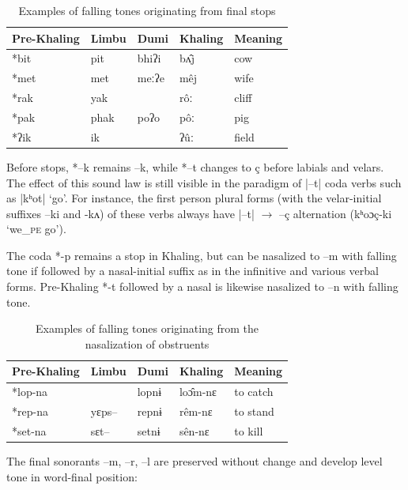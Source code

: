 \documentclass[oldfontcommands,oneside,a4paper,11pt]{article}
\newcommand{\ipa}[1]{{\phon \mbox{#1}}} %
\begin{document}
\begin{table}[h]
\caption{Examples of falling tones originating from final stops} \centering \label{tab:fall.stop}
\begin{tabular}{lllll}
\toprule
Pre-Khaling	&Limbu	&Dumi	&Khaling	&Meaning\\
\midrule
\ipa{*bit}	& \ipa{pit} &	\ipa{bhiʔi}	 & \ipa{bʌ̂j} &	cow\\
\ipa{*met} &	\ipa{met}	& \ipa{meːʔe} &	\ipa{mêj} &	wife\\
\ipa{*rak}	& \ipa{yak}	& &	\ipa{rôː}	& cliff \\
\ipa{*pak} &	\ipa{phak}	& \ipa{poʔo}	& \ipa{pôː}	& pig\\
\ipa{*ʔik}	& \ipa{ik}	& &	\ipa{ʔûː}	& field\\
\bottomrule
\end{tabular}
\end{table}
 
Before stops, \ipa{*--k} remains \ipa{--k}, while \ipa{*--t} changes to \ipa{ç} before labials and velars. The effect of this sound law  is still visible in the paradigm of  |--t| coda verbs such as |\ipa{kʰot}| `go'. For instance, the first person plural forms (with the velar-initial suffixes \ipa{--ki} and \ipa{-kʌ}) of these verbs always have |--t| $\rightarrow$ \ipa{--ç} alternation  (\ipa{kʰoɔç-ki} `we_{\textsc{pe}} go').

The coda \ipa{*-p} remains a stop in Khaling, but can be nasalized to \ipa{–m} with falling tone if followed by a nasal-initial suffix as in the infinitive and various verbal forms. Pre-Khaling \ipa{*-t} followed by a nasal is likewise nasalized to \ipa{--n} with falling tone.
\begin{table}[h]
\caption{Examples of falling tones originating from the nasalization of obstruents} \centering
\begin{tabular}{lllll}
\toprule
Pre-Khaling	&Limbu	&Dumi	&Khaling	&Meaning\\
\midrule
\ipa{*lop-na}	& & \ipa{lopnɨ}	 & \ipa{loɔ̂m-nɛ}	&to catch\\
\ipa{*rep-na}	&\ipa{yɛps--} & \ipa{repnɨ	}& \ipa{rêm-nɛ}	&to stand\\
\ipa{*set-na}	&  \ipa{sɛt--}& \ipa{setnɨ	}& \ipa{sên-nɛ}	&to kill\\
\bottomrule
\end{tabular}
\end{table}

The final sonorants \ipa{--m}, \ipa{--r}, \ipa{--l} are preserved without change and develop level tone in word-final position:
\end{document}
